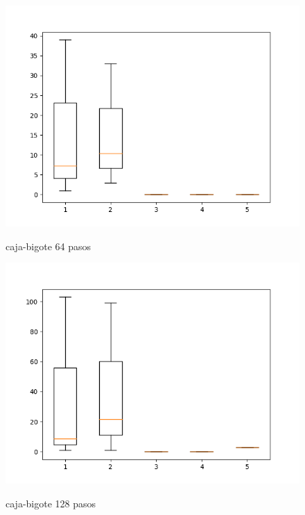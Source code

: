 \documentclass[a4paper, 11pt]{article}
\begin{document}
\begin{figure}[H]
      \centering
      \caption{caja-bigote 64 pasos} 
      \includegraphics[scale=.7]{64_pasos.png}  
      \label{cb64}
\end{figure}

\begin{figure}[H]
      \centering
      \caption{caja-bigote 128 pasos}
      \includegraphics[scale=.7]{128_pasos.png} 
      \label{cb128}
\end{figure}
\end{document}
